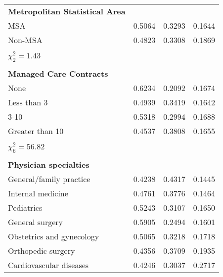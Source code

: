 \documentclass[11pt, oneside]{article}        %
\begin{document}
\begin{longtable}[h]
\begin{tabular}{llll}
\textbf{Metropolitan Statistical Area} &          &            &            \\
MSA                                    & 0.5064   & 0.3293     & 0.1644     \\
Non-MSA                                & 0.4823   & 0.3308     & 0.1869     \\
                                       &          &            &            \\
$\chi^2_2 = 1.43$                      &          &            &            \\
                                       &          &            &            \\
\textbf{Managed Care Contracts}        &          &            &            \\
None                                   & 0.6234   & 0.2092     & 0.1674     \\
Less than 3                            & 0.4939   & 0.3419     & 0.1642     \\
3-10                                   & 0.5318   & 0.2994     & 0.1688     \\
Greater than 10                        & 0.4537   & 0.3808     & 0.1655     \\
                                       &          &            &            \\
$\chi^2_6 = 56.82$                     &          &            &            \\
                                       &          &            &            \\
\textbf{Physician specialties}         &          &            &            \\
General/family practice                & 0.4238   & 0.4317     & 0.1445     \\
Internal medicine                      & 0.4761   & 0.3776     & 0.1464     \\
Pediatrics                             & 0.5243   & 0.3107     & 0.1650     \\
General surgery                        & 0.5905   & 0.2494     & 0.1601     \\
Obstetrics and gynecology              & 0.5065   & 0.3218     & 0.1718     \\
Orthopedic surgery                     & 0.4356   & 0.3709     & 0.1935     \\
Cardiovascular diseases                & 0.4246   & 0.3037     & 0.2717     \\

\end{tabular}
\end{longtable}
\end{document}
